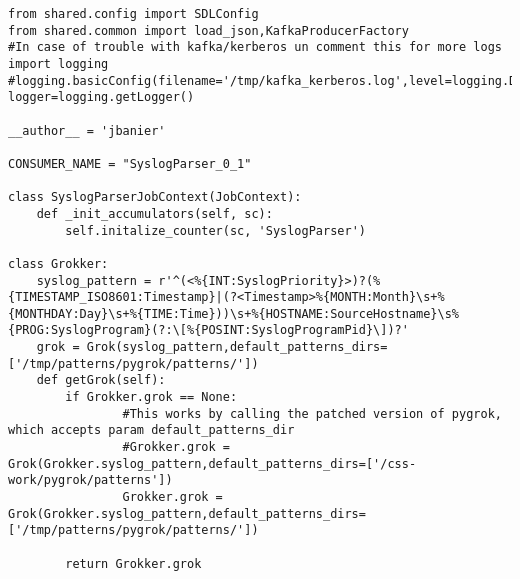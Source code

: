 \documentclass[a4paper,12pt]{article}
\begin{document}
{\begin{lstlisting}
from shared.config import SDLConfig
from shared.common import load_json,KafkaProducerFactory
#In case of trouble with kafka/kerberos un comment this for more logs
import logging
#logging.basicConfig(filename='/tmp/kafka_kerberos.log',level=logging.DEBUG)
logger=logging.getLogger()

__author__ = 'jbanier'

CONSUMER_NAME = "SyslogParser_0_1"

class SyslogParserJobContext(JobContext):
    def _init_accumulators(self, sc):
        self.initalize_counter(sc, 'SyslogParser')

class Grokker:
    syslog_pattern = r'^(<%{INT:SyslogPriority}>)?(%{TIMESTAMP_ISO8601:Timestamp}|(?<Timestamp>%{MONTH:Month}\s+%{MONTHDAY:Day}\s+%{TIME:Time}))\s+%{HOSTNAME:SourceHostname}\s%{PROG:SyslogProgram}(?:\[%{POSINT:SyslogProgramPid}\])?'
    grok = Grok(syslog_pattern,default_patterns_dirs=['/tmp/patterns/pygrok/patterns/'])
    def getGrok(self):
        if Grokker.grok == None:
                #This works by calling the patched version of pygrok, which accepts param default_patterns_dir
                #Grokker.grok = Grok(Grokker.syslog_pattern,default_patterns_dirs=['/css-work/pygrok/patterns'])
                Grokker.grok = Grok(Grokker.syslog_pattern,default_patterns_dirs=['/tmp/patterns/pygrok/patterns/'])
                
        return Grokker.grok


\end{lstlisting}}
\end{document}
